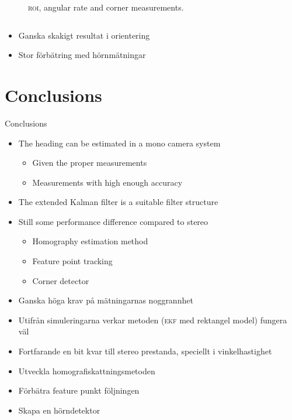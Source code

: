 \documentclass{beamer}
\newcommand{\roi}{\textsc{roi}\xspace}
\newcommand{\ekf}{\textsc{ekf}\xspace}
\renewcommand{\a}{\r{a}\xspace}
\renewcommand{\aa}{\"a\xspace}
\renewcommand{\o}{\"o\xspace}
\begin{document}
\begin{frame}
\begin{columns}
\begin{figure}
		\caption{\roi, angular rate and corner measurements.}
	\end{figure}
	\end{columns}

	\note
	{
		\begin{itemize}
			\item Ganska skakigt resultat i orientering
			\item Stor f\o{}rb\aa{}tring med h\o{}rnm\aa{}tningar
		\end{itemize}
	}
\end{frame}

\section{Conclusions}

\begin{frame}{Conclusions}
	\begin{itemize}
		\item The heading can be estimated in a mono camera system
		\begin{itemize}
			\item Given the proper measurements
			\item Measurements with high enough accuracy
		\end{itemize}
		\item The extended Kalman filter is a suitable filter structure
		\item Still some performance difference compared to stereo
        \begin{itemize}
            \item Homography estimation method
            \item Feature point tracking
            \item Corner detector
        \end{itemize}
	\end{itemize}

	\note
	{
		\begin{itemize}
			\item Ganska h\o{}ga krav p\a{} m\aa{}tningarnas noggrannhet
			\item Utifr\a{}n simuleringarna verkar metoden (\ekf med rektangel model) fungera v\aa{}l
			\item Fortfarande en bit kvar till stereo prestanda, speciellt i vinkelhastighet
			\vspace{2em}
			\item Utveckla homografiskattningsmetoden
			\item F\o{}rb\aa{}tra feature punkt f\o{}ljningen
			\item Skapa en h\o{}rndetektor
		\end{itemize}
	}
\end{frame}
\end{document}
